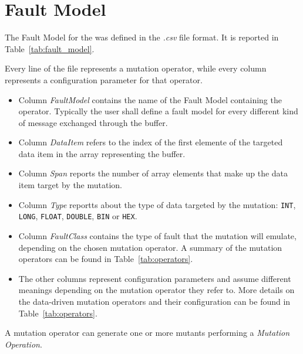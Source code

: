 \section{Fault Model}

The Fault Model for the \case was defined in the \emph{.csv} file format. It is reported in Table~\ref{tab:fault_model}.



Every line of the file represents a mutation operator, while every column represents a configuration parameter for that operator.

\begin{itemize}
  \item Column \emph{FaultModel} contains the name of the Fault Model containing the operator. Typically the user shall define a fault model for every different kind of message exchanged through the buffer.

  \item Column \emph{DataItem} refers to the index of the first elemente of the targeted data item in the array representing the buffer.

  \item Column \emph{Span} reports the number of array elements that make up the data item target by the mutation.

  \item Column \emph{Type} reportts about the type of data targeted by the mutation: \texttt{INT}, \texttt{LONG}, \texttt{FLOAT}, \texttt{DOUBLE}, \texttt{BIN} or \texttt{HEX}.

  \item Column \emph{FaultClass} contains the type of fault that the mutation will emulate, depending on the chosen mutation operator. A summary of the mutation operators can be found in Table~\ref{tab:operators}.

  \item The other columns represent configuration parameters and assume different meanings depending on the mutation operator they refer to. More details on the data-driven mutation operators and their configuration can be found in Table~\ref{tab:operators}.

\end{itemize}



A mutation operator can generate one or more mutants performing a \emph{Mutation Operation}.
